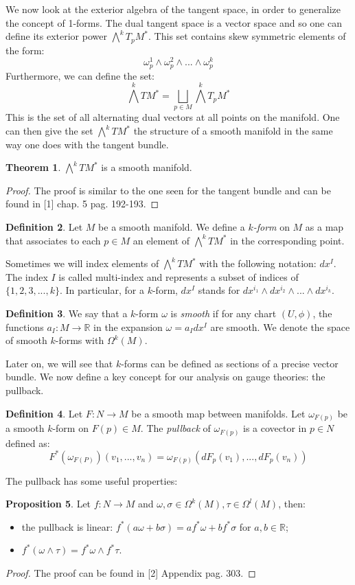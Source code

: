 \documentclass[12pt,a4paper]{report}
\theoremstyle{definition}
\newtheorem{Def}{Definition}[chapter]
\theoremstyle{Theorem}
\newtheorem{Theo}[Def]{Theorem}
\newtheorem{Prop}[Def]{Proposition}
\theoremstyle{definition}
\theoremstyle{definition}
\begin{document}
	We now look at the exterior algebra of the tangent space, in order to generalize the concept of 1-forms. The dual tangent space is a vector space and so one can define its exterior power $\bigwedge^k T_pM^*$. This set contains skew symmetric elements of the form:
	$$\omega^1_p\wedge \omega^2_p\wedge...\wedge \omega^k_p$$
	Furthermore, we can define the set:
	$$\bigwedge^k TM^*=\bigsqcup_{p\in M}\bigwedge^k T_pM^*$$
	This is the set of all alternating dual vectors at all points on the manifold. One can then give the set $\bigwedge^k TM^*$ the structure  of a smooth manifold in the same way one does with the tangent bundle.
	\begin{Theo}
		$\bigwedge^kTM^*$ is a smooth manifold.
	\end{Theo}
	\begin{proof}
		The proof is similar to the one seen for the tangent bundle and can be found in [1] chap. 5 pag. 192-193.
	\end{proof}
	\begin{Def}
		Let $M$ be a smooth manifold. We define a \textit{$k$-form} on $M$ as a map that associates to each $p\in M$ an element of $\bigwedge^k TM^*$ in the corresponding point. 
	\end{Def}
	Sometimes we will index elements of $\bigwedge^k TM^*$ with the following notation: $dx^I$. The index $I$ is called multi-index and represents a subset of indices of $\{1,2,3,...,k\}$. In particular, for a $k$-form, $dx^I$ stands for $dx^{i_1}\wedge dx^{i_2}\wedge...\wedge dx^{i_k}$.
	\begin{Def}
		We say that a $k$-form $\omega$ is \textit{smooth} if for any chart $(U,\phi)$, the functions $a_I:M\rightarrow \mathbb{R}$ in the expansion $\omega=a_Idx^I$ are smooth.
		We denote the space of smooth $k$-forms with $\Omega^k(M)$. 
	\end{Def}
	Later on, we will see that $k$-forms can be defined as sections of a precise vector bundle. We now define a key concept for our analysis on gauge theories: the pullback.
	\begin{Def}
		Let $F:N\rightarrow M$ be a smooth map between manifolds.
		Let $\omega_{F(p)}$ be a smooth $k$-form on $F(p)\in M$. The \textit{pullback} of $\omega_{F(p)}$ is a covector in $p\in N$ defined as:
		$$F^*(\omega_{F(P)})(v_1,...,v_n)=\omega_{F(p)}(dF_p(v_1),...,dF_p(v_n))$$ 
	\end{Def}
	The pullback has some useful properties:
	\begin{Prop}
		Let $f:N\rightarrow M$ and $\omega,\sigma\in \Omega^k(M),\tau\in\Omega^l(M)$, then:
		\begin{itemize}
			\item the pullback is linear: $f^*(a\omega+b\sigma)=af^*\omega+bf^*\sigma$ for $a,b\in \mathbb{R}$;
			\item $f^*(\omega\wedge \tau)=f^*\omega\wedge f^*\tau$.
		\end{itemize}
	\end{Prop}
	\begin{proof}
		The proof can be found in [2] Appendix pag. 303.
	\end{proof}
\end{document}
